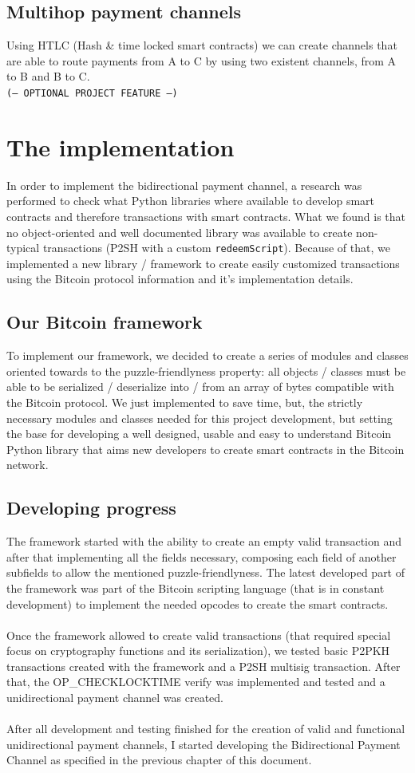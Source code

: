 \documentclass[12pt,journal,compsoc]{IEEEtran}
\newcommand{\code}[1]{\texttt{#1}}
\begin{document}
\subsection{Multihop payment channels}
Using HTLC (Hash & time locked smart contracts) we can create channels that are able to route payments from A to C by using two existent channels, from A to B and B to C.
\\\code{(-- OPTIONAL PROJECT FEATURE --)}
\section{The implementation}
In order to implement the bidirectional payment channel, a research was performed to check what Python libraries where available to develop smart contracts and therefore transactions with smart contracts. What we found is that no object-oriented and well documented library was available to create non-typical transactions (P2SH with a custom \code{redeemScript}). Because of that, we implemented a new library / framework to create easily customized transactions using the Bitcoin protocol information and it's implementation details\cite{bitcoin-org-developer:online, bitcoin-wiki-proto:online}.
\subsection{Our Bitcoin framework}
To implement our framework, we decided to create a series of modules and classes oriented towards to the puzzle-friendlyness property: all objects / classes must be able to be serialized / deserialize into / from an array of bytes compatible with the Bitcoin protocol. We just implemented to save time, but, the strictly necessary modules and classes needed for this project development, but setting the base for developing a well designed, usable and easy to understand Bitcoin Python library that aims new developers to create smart contracts in the Bitcoin network.
\subsection{Developing progress}
The framework started with the ability to create an empty valid transaction and after that implementing all the fields necessary, composing each field of another subfields to allow the mentioned puzzle-friendlyness. The latest developed part of the framework was part of the Bitcoin scripting language (that is in constant development) to implement the needed opcodes to create the smart contracts.\\\\
Once the framework allowed to create valid transactions (that required special focus on cryptography functions and its serialization), we tested basic P2PKH transactions created with the framework and a P2SH multisig transaction. After that, the OP\_CHECKLOCKTIME verify was implemented and tested and a unidirectional payment channel was created.\\\\
After all development and testing finished for the creation of valid and functional unidirectional payment channels, I started developing the Bidirectional Payment Channel as specified in the previous chapter of this document.
\end{document}
